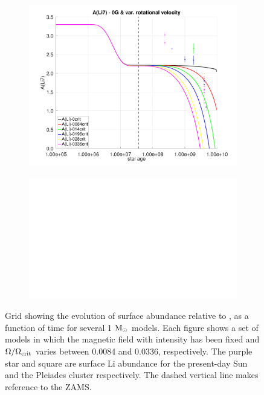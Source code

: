\documentclass[fleqn,usenatbib]{mnras}
\begin{document}
\begin{figure}
\begin{subfigure}[h]{0.47\textwidth}
    \includegraphics[trim = 25mm 10mm 15mm 10mm, clip,width=\textwidth]{figures/paper2/li_var_vel_0_0g_0.pdf}
    \label{fig:subim13}
    \end{subfigure}
    \begin{subfigure}[h]{0.47\textwidth}
    \includegraphics[width=\textwidth]{figures/blank.eps}
    \label{fig:subim14}
    \end{subfigure}

\caption{Grid showing the evolution of surface  abundance relative to , as a function of time for several 1 $\mathrm{M}_\odot$ models. Each figure shows a set of models in which the magnetic field with intensity has been fixed and $\Omega / \Omega_{\mathrm{crit}}$ varies between 0.0084 and 0.0336, respectively. The purple star and square are surface Li abundance for the present-day Sun \citep{Asplund2009} and the Pleiades cluster \citep{Sestito2005} respectively. The dashed vertical line makes reference to the ZAMS.}
\label{fig:grid_li_var_vel}
\end{figure}
\par
\end{document}
